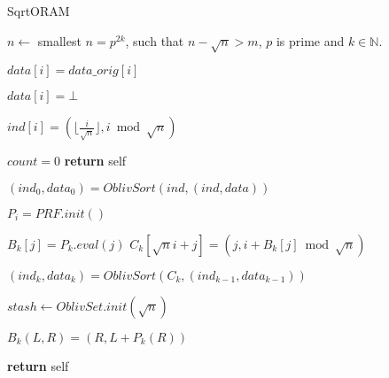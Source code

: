 \begin{algorithm}
\caption{SqrtORAM}
\label{alg:oram}
\begin{algorithmic}[1]


\State $n \gets$ smallest $n= p^{2k}$, such that $n - \sqrt{n} > m$, $p$ is prime and $k \in \mathbb{N}$.

   \State $data[i] = data\_orig[i]$
\EndFor

   \State $data[i] = \bot$
\EndFor
   
    \State $ind[i]  = (\lfloor{ \frac{i}{\sqrt{n}}} \rfloor ,  i \bmod \sqrt{n}) $
\EndFor

\State $count = 0$
\State \textbf{return} self
\EndProcedure

\State


\State $(ind_0, data_0) = OblivSort(ind, (ind, data))$ \label{line:first_sort}

    \State $P_i = PRF.init()$ 

        \State $B_k[j] = P_k.eval(j)$ \label{line:prf_eval}
            \State $C_k[\sqrt{n} i + j] = (j, i + B_k[j] \bmod \sqrt{n})$
        \EndFor
    \EndFor
 
    \State $(ind_k, data_k) = OblivSort(C_k, (ind_{k-1}, data_{k-1}))$
        \label{line:second_sort}
  
\EndFor

\State $stash \gets OblivSet.init(\sqrt{n})$

  $B_k (L, R) = (R, L + P_k(R))$

\State \textbf{return} self

\EndProcedure

\State


\end{algorithmic}
\end{algorithm}

